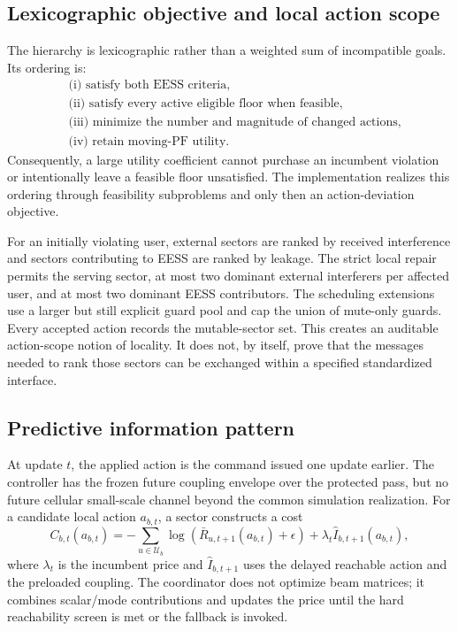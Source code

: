 \documentclass[journal]{IEEEtran}
\newcommand{\U}{\mathcal{U}}
\begin{document}
\subsection{Lexicographic objective and local action scope}
The hierarchy is lexicographic rather than a weighted sum of incompatible goals. Its ordering is:
\begin{align}
&\text{(i) satisfy both EESS criteria,}\nonumber\\
&\text{(ii) satisfy every active eligible floor when feasible,}\nonumber\\
&\text{(iii) minimize the number and magnitude of changed actions,}\nonumber\\
&\text{(iv) retain moving-PF utility.}
\label{eq:lexicographic}
\end{align}
Consequently, a large utility coefficient cannot purchase an incumbent violation or intentionally leave a feasible floor unsatisfied. The implementation realizes this ordering through feasibility subproblems and only then an action-deviation objective.

For an initially violating user, external sectors are ranked by received interference and sectors contributing to EESS are ranked by leakage. The strict local repair permits the serving sector, at most two dominant external interferers per affected user, and at most two dominant EESS contributors. The scheduling extensions use a larger but still explicit guard pool and cap the union of mute-only guards. Every accepted action records the mutable-sector set. This creates an auditable action-scope notion of locality. It does not, by itself, prove that the messages needed to rank those sectors can be exchanged within a specified standardized interface.

\subsection{Predictive information pattern}
At update $t$, the applied action is the command issued one update earlier. The controller has the frozen future coupling envelope over the protected pass, but no future cellular small-scale channel beyond the common simulation realization. For a candidate local action $a_{b,t}$, a sector constructs a cost
\begin{equation}
 C_{b,t}(a_{b,t})=
 -\sum_{u\in\U_b}\log\!\left(\bar R_{u,t+1}(a_{b,t})+\epsilon\right)
 +\lambda_t \widehat I_{b,t+1}(a_{b,t}),
 \label{eq:local-cost}
\end{equation}
where $\lambda_t$ is the incumbent price and $\widehat I_{b,t+1}$ uses the delayed reachable action and the preloaded coupling. The coordinator does not optimize beam matrices; it combines scalar/mode contributions and updates the price until the hard reachability screen is met or the fallback is invoked.
\end{document}
